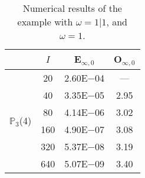 \begin{table}[H]
\setlength{\tabcolsep}{5pt}
\centering
\caption{Numerical results of the example with $\omega=1|1$, and $\omega=1$.}
  \begin{tabular}{@{}l c c c@{}}
\toprule
 & $I$ & E$_{\infty,0}$ & O$_{\infty,0}$\\
\midrule
\multirow{6}{*}{$\mathbb{P}_{3}$(4)}
 & 20 & 2.60E$-$04 & ---\\
 & 40 & 3.35E$-$05 & 2.95\\
 & 80 & 4.14E$-$06 & 3.02\\
 & 160 & 4.90E$-$07 & 3.08\\
 & 320 & 5.37E$-$08 & 3.19\\
 & 640 & 5.07E$-$09 & 3.40\\
\bottomrule
\end{tabular}
\label{Table:PRO:test_01_01_test39_pro1}
\end{table}
